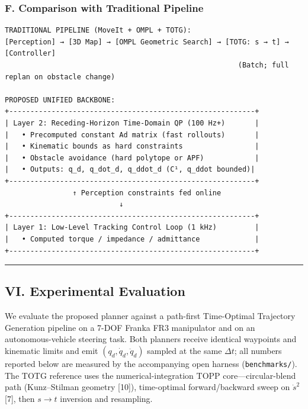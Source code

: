 \subsubsection{F. Comparison with Traditional
Pipeline}\label{f.-comparison-with-traditional-pipeline}

\begin{verbatim}
TRADITIONAL PIPELINE (MoveIt + OMPL + TOTG):
[Perception] → [3D Map] → [OMPL Geometric Search] → [TOTG: s → t] → [Controller]
                                                       (Batch; full replan on obstacle change)

PROPOSED UNIFIED BACKBONE:
+----------------------------------------------------------+
| Layer 2: Receding-Horizon Time-Domain QP (100 Hz+)       |
|   • Precomputed constant Ad matrix (fast rollouts)       |
|   • Kinematic bounds as hard constraints                 |
|   • Obstacle avoidance (hard polytope or APF)            |
|   • Outputs: q_d, q_dot_d, q_ddot_d (C¹, q_ddot bounded)|
+----------------------------------------------------------+
                ↑ Perception constraints fed online
                           ↓
+----------------------------------------------------------+
| Layer 1: Low-Level Tracking Control Loop (1 kHz)         |
|   • Computed torque / impedance / admittance             |
+----------------------------------------------------------+
\end{verbatim}

\begin{center}\rule{0.5\linewidth}{0.5pt}\end{center}

\subsection{VI. Experimental
Evaluation}\label{vi.-experimental-evaluation}

We evaluate the proposed planner against a path-first Time-Optimal
Trajectory Generation pipeline on a 7-DOF Franka FR3 manipulator and on
an autonomous-vehicle steering task. Both planners receive identical
waypoints and kinematic limits and emit \((q_d, \dot q_d, \ddot q_d)\)
sampled at the same \(\Delta t\); all numbers reported below are
measured by the accompanying open harness (\texttt{benchmarks/}). The
TOTG reference uses the numerical-integration TOPP core---circular-blend
path (Kunz--Stilman geometry {[}10{]}), time-optimal forward/backward
sweep on \(\dot s^2\) {[}7{]}, then \(s\!\to\!t\) inversion and
resampling.


